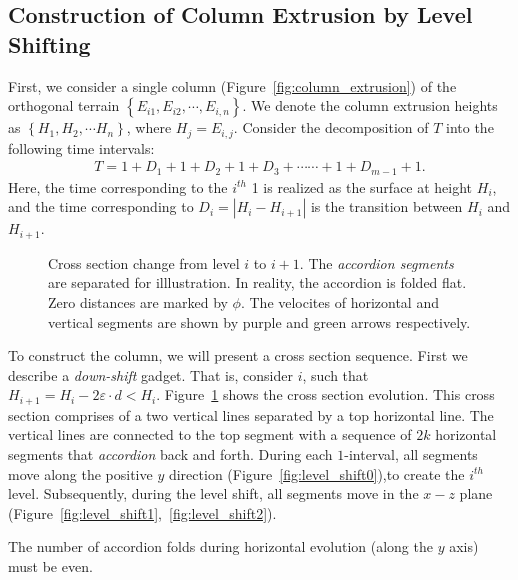\subsection{Construction of Column Extrusion by Level Shifting}
\label{sec:column_extrusion}

First, we consider a single column (Figure~\ref{fig:column_extrusion})
of the orthogonal terrain $\left\{ E_{i1}, E_{i2}, \cdots, E_{i,n} \right\}$.
We denote the column extrusion heights as $\left\{ H_1, H_2,\cdots H_n \right\}$, where $H_j = E_{i,j}$.
Consider the decomposition of $T$ into the following time intervals:%
\begin{align}
    \label{eq:column_decomposition}
T = 1 + D_1  +  1 + D_2  +  1 + D_3  +\cdots\cdots +  1 + D_{m-1}  +  1.
\end{align}
Here, the time corresponding to the $i^{th}$ 1 is realized as the surface at height $H_i$,
and the time corresponding to $D_i = \left| H_i-H_{i+1}\right|$ is the transition between $H_i$ and $H_{i+1}$.

\graphicspath{{./figures/}}
\begin{figure}[htb]
    \def\svgwidth{1.0\textwidth}
    \caption{
    Cross section change from level $i$ to $i+1$. The \emph{accordion segments} are separated for illlustration.
    In reality, the accordion is folded flat. Zero distances are marked by $\phi$.
    The velocites of horizontal and vertical segments are shown by purple and green arrows respectively.
    }
    \label{fig:level_shift_layers}
\end{figure}

%

To construct the column, we will present a cross section sequence. First we describe a \emph{down-shift} gadget.
That is, consider $i$, such that $H_{i+1} = H_i-2\varepsilon\cdot d < H_i$.
Figure~\ref{fig:level_shift_layers} shows the cross section evolution.
This cross section comprises of a two vertical lines separated by a top horizontal line.
The vertical lines are connected to the top segment with
a sequence of $2k$ horizontal segments that \emph{accordion} back and forth.
During each $1$-interval, all segments move along the positive $y$ direction (Figure~\ref{fig:level_shift0}),to create the $i^{th}$ level.
Subsequently, during the level shift, all segments move in the $x-z$ plane (Figure~\ref{fig:level_shift1},~\ref{fig:level_shift2}).
\begin{property}
\label{pro:accordion_even}
The number of accordion folds during horizontal evolution (along the $y$ axis) must be even.
\end{property}

